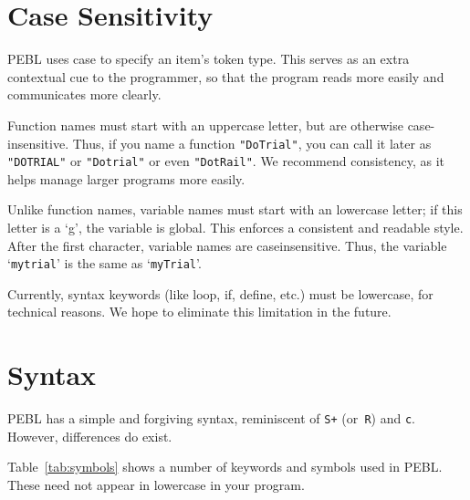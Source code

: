 \section{Case Sensitivity}

PEBL uses case to specify an item's token type. This serves as an extra contextual cue to the programmer, so that the program reads more easily and communicates more clearly.

Function names must start with an uppercase letter, but are otherwise
case-insensitive.  Thus, if you name a function \texttt{"DoTrial"}, you can
call it later as \texttt{"DOTRIAL"} or \texttt{"Dotrial"} or even \texttt{"DotRail"}.  We recommend consistency, as it helps manage larger programs more easily.

Unlike function names, variable names must start with an lowercase letter; if this letter is a `g', the variable is global. This enforces a consistent and readable style. After the first character, variable names are caseinsensitive. Thus, the variable `\texttt{mytrial}' is the same as `\texttt{myTrial}'.

Currently, syntax keywords (like loop, if, define, etc.) must be
lowercase, for technical reasons. We hope to eliminate this limitation in the future.



\section{ Syntax}

PEBL has a simple and forgiving syntax, reminiscent of \texttt{S+} (or\texttt{ R})
and \texttt{c}. However, differences do exist.

Table~\ref{tab:symbols} shows a number of keywords and symbols used in PEBL. These need not appear in lowercase in your program.


